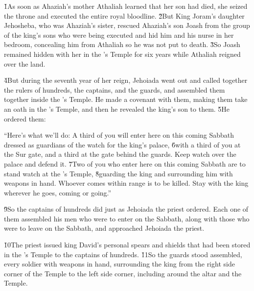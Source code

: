 \v{1}As soon as Ahaziah's mother Athaliah learned that her son had died, she seized the throne and executed the entire royal bloodline. \v{2}But King Joram's daughter Jehosheba, who was Ahaziah's sister, rescued Ahaziah's son Joash from the group of the king's sons who were being executed and hid him and his nurse in her bedroom, concealing him from Athaliah so he was not put to death. \v{3}So Joash remained hidden with her in the 's Temple for six years while Athaliah reigned over the land.

\v{4}But during the seventh year of her reign, Jehoiada went out and called together the rulers of hundreds, the captains, and the guards, and assembled them together inside the 's Temple. He made a covenant with them, making them take an oath in the 's Temple, and then he revealed the king's son to them. \v{5}He ordered them:

\begin{poetry}
\poeml ``Here's what we'll do: A third of you will enter here on this coming Sabbath dressed as guardians of the watch for the king's palace, \v{6}with a third of you at the Sur gate, and a third at the gate behind the guards. Keep watch over the palace and defend it. \v{7}Two of you who enter here on this coming Sabbath are to stand watch at the 's Temple, \v{8}guarding the king and surrounding him with weapons in hand. Whoever comes within range is to be killed. Stay with the king wherever he goes, coming or going.''
\end{poetry}

\v{9}So the captains of hundreds did just as Jehoiada the priest ordered. Each one of them assembled his men who were to enter on the Sabbath, along with those who were to leave on the Sabbath, and approached Jehoiada the priest.

\v{10}The priest issued king David's personal spears and shields that had been stored in the 's Temple to the captains of hundreds. \v{11}So the guards stood assembled, every soldier with weapons in hand, surrounding the king from the right side corner of the Temple to the left side corner, including around the altar and the Temple.


